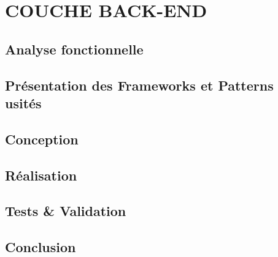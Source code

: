 \setcounter{chapter}{4}
\chapter{COUCHE BACK-END}
\minitoc %
\graphicspath{{Chapitre5/figures/}}


\pagestyle{fancy}
\fancyhf{}
\fancyhead[R]{\bfseries\rightmark}
\fancyfoot[R]{\thepage}
\renewcommand{\headrulewidth}{0.5pt}
\renewcommand{\footrulewidth}{0pt}
\renewcommand{\chaptermark}[1]{\markboth{\MakeUppercase{\chaptername~\thechapter. #1 }}{}}
\renewcommand{\sectionmark}[1]{\markright{\thechapter.\thesection~ #1}}

\begin{spacing}{1.5}

\section*{Analyse fonctionnelle}



\section{Présentation des Frameworks et Patterns usités}


\section{Conception}


\section{Réalisation}


\section{Tests \& Validation}


\section*{Conclusion}


\end{spacing}
